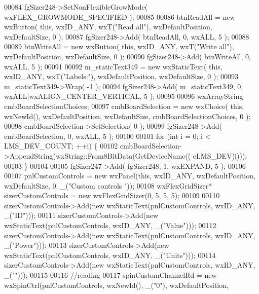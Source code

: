 \begin{DoxyCode}
00084     fgSizer248->SetNonFlexibleGrowMode( wxFLEX\_GROWMODE\_SPECIFIED );
00085 
00086     btnReadAll = \textcolor{keyword}{new} wxButton( \textcolor{keyword}{this}, wxID\_ANY, wxT(\textcolor{stringliteral}{"Read all"}), wxDefaultPosition, wxDefaultSize, 0 );
00087     fgSizer248->Add( btnReadAll, 0, wxALL, 5 );
00088 
00089     btnWriteAll = \textcolor{keyword}{new} wxButton( \textcolor{keyword}{this}, wxID\_ANY, wxT(\textcolor{stringliteral}{"Write all"}), wxDefaultPosition, wxDefaultSize, 0 );
00090     fgSizer248->Add( btnWriteAll, 0, wxALL, 5 );
00091 
00092     m_staticText349 = \textcolor{keyword}{new} wxStaticText( \textcolor{keyword}{this}, wxID\_ANY, wxT(\textcolor{stringliteral}{"Labels:"}), wxDefaultPosition, wxDefaultSize, 0
       );
00093     m_staticText349->Wrap( -1 );
00094     fgSizer248->Add( m_staticText349, 0, wxALL|wxALIGN\_CENTER\_VERTICAL, 5 );
00095 
00096     wxArrayString cmbBoardSelectionChoices;
00097     cmbBoardSelection = \textcolor{keyword}{new} wxChoice( \textcolor{keyword}{this}, wxNewId(), wxDefaultPosition, wxDefaultSize, 
      cmbBoardSelectionChoices, 0 );
00098     cmbBoardSelection->SetSelection( 0 );
00099     fgSizer248->Add( cmbBoardSelection, 0, wxALL, 5 );
00100 
00101     \textcolor{keywordflow}{for} (\textcolor{keywordtype}{int} i = 0; i < LMS_DEV_COUNT; ++i) \{
00102         cmbBoardSelection->AppendString(wxString::From8BitData(GetDeviceName((
      eLMS_DEV)i)));
00103     \}
00104 
00105     fgSizer247->Add( fgSizer248, 1, wxEXPAND, 5 );
00106 
00107     pnlCustomControls = \textcolor{keyword}{new} wxPanel(\textcolor{keyword}{this}, wxID\_ANY, wxDefaultPosition, wxDefaultSize, 0, \_(\textcolor{stringliteral}{"Custom controls
      "}));
00108     wxFlexGridSizer* sizerCustomControls = \textcolor{keyword}{new} wxFlexGridSizer(0, 5, 5, 5);
00109 
00110     sizerCustomControls->Add(\textcolor{keyword}{new} wxStaticText(pnlCustomControls, wxID\_ANY, \_(\textcolor{stringliteral}{"ID"})));
00111     sizerCustomControls->Add(\textcolor{keyword}{new} wxStaticText(pnlCustomControls, wxID\_ANY, \_(\textcolor{stringliteral}{"Value"})));
00112     sizerCustomControls->Add(\textcolor{keyword}{new} wxStaticText(pnlCustomControls, wxID\_ANY, \_(\textcolor{stringliteral}{"Power"})));
00113     sizerCustomControls->Add(\textcolor{keyword}{new} wxStaticText(pnlCustomControls, wxID\_ANY, \_(\textcolor{stringliteral}{"Units"})));
00114     sizerCustomControls->Add(\textcolor{keyword}{new} wxStaticText(pnlCustomControls, wxID\_ANY, \_(\textcolor{stringliteral}{""})));
00115 
00116     \textcolor{comment}{//reading}
00117     spinCustomChannelRd = \textcolor{keyword}{new} wxSpinCtrl(pnlCustomControls, wxNewId(), \_(\textcolor{stringliteral}{"0"}), wxDefaultPosition, 

\end{DoxyCode}
